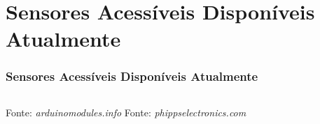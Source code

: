 \documentclass[xcolor=dvipsnames, aspectratio=169]{beamer}
\begin{document}
\section[Sensores Acessíveis e Disponíveis Atualmente]{Sensores Acessíveis Disponíveis Atualmente} 
\begin{frame}[fragile]
	\frametitle{Sensores Acessíveis Disponíveis Atualmente}
	\begin{columns}[t]
		\centering
		{Fonte: \textit{arduinomodules.info}}
		{Fonte: \textit{phippselectronics.com}}
	\end{columns}
\end{frame}
\end{document}
